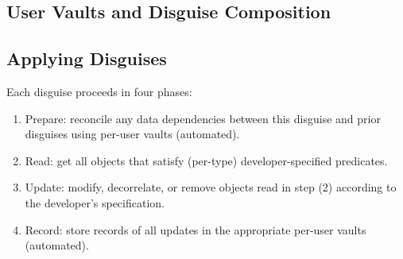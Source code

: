 \subsection{User Vaults and Disguise Composition}
\label{sec:composition}


\subsection{Applying Disguises}
\label{sec:applying}
Each disguise proceeds in four phases:
\begin{enumerate}
    \item Prepare: reconcile any data dependencies between this disguise and prior disguises using per-user vaults (automated).
    \item Read: get all objects that satisfy (per-type) developer-specified predicates.
    \item Update: modify, decorrelate, or remove objects read in step (2) according to the
        developer's specification.
    \item Record: store records of all updates in the appropriate per-user vaults (automated).
\end{enumerate}


\iffalse
\sys also handles user data management and storage.
While unsubscribing a user, \sys tracks all deletions and modifications to the database.
\sys encrypts this log with a per-user key, and stores this encrypted
blob in a dedicated application datastore (Figure~\ref{fig:arch}, step 5). The user key is secret-shared using a (2, 3)
threshold scheme~\cite{secretsharing} between the user, \sys, and a trusted third party (\eg
Amazon S3), so that the user can authorize \sys and the third party to restore the key if
the user forgets their share.
The user can optionally choose to store this encrypted data themselves
and be in charge of providing their data and key to \sys to decrypt the data upon
resubscription.

To resubscribe, a user authorizes the decryption of their data and associated metadata by
providing their share of the key (or authorizing a trusted third party to reconstruct the secret
with the application). \sys decrypts the data with the key, and systematically reverses
the modifications made during unsubscription, restoring removed entities and correlations between
entities.
\fi
